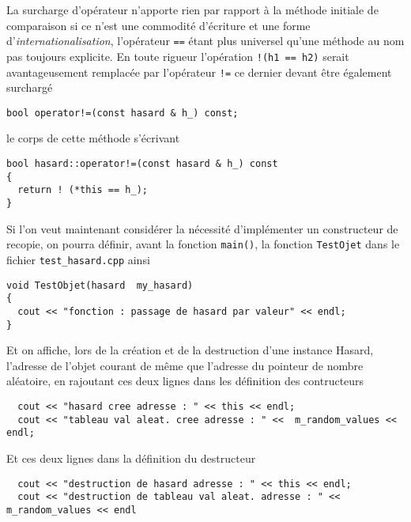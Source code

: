 \documentclass{book}
\begin{document}
\begin{correction}
La surcharge d'opérateur n'apporte rien par rapport à la méthode initiale de
comparaison si ce n'est une commodité d'écriture et une forme
d'\textit{internationalisation}, l'opérateur \texttt{==} étant plus universel qu'une méthode au
nom pas toujours explicite. En toute rigueur l'opération \texttt{!(h1 == h2)} serait
avantageusement remplacée par l'opérateur \texttt{!=} ce dernier devant être également
surchargé
\begin{verbatim}
bool operator!=(const hasard & h_) const;
\end{verbatim}
le corps de cette méthode s'écrivant
\begin{verbatim}
bool hasard::operator!=(const hasard & h_) const
{
  return ! (*this == h_);
}
\end{verbatim}




Si l'on veut maintenant considérer la nécessité d'implémenter un constructeur de recopie, on pourra définir,
avant la fonction \texttt{main()}, la fonction  \texttt{TestOjet} dans le fichier \texttt{test\_hasard.cpp} ainsi

\begin{verbatim}
void TestObjet(hasard  my_hasard)
{
  cout << "fonction : passage de hasard par valeur" << endl;
}
\end{verbatim}

Et on affiche, lors de la création et de la destruction d'une instance Hasard, l'adresse de l’objet
courant de même que l'adresse du pointeur de nombre aléatoire, en rajoutant ces deux lignes
dans les définition des contructeurs 

\begin{verbatim}
  cout << "hasard cree adresse : " << this << endl;
  cout << "tableau val aleat. cree adresse : " <<  m_random_values << endl;
\end{verbatim}

Et ces deux lignes dans la définition du destructeur
\begin{verbatim}
  cout << "destruction de hasard adresse : " << this << endl;
  cout << "destruction de tableau val aleat. adresse : " <<  m_random_values << endl
\end{verbatim}



\end{correction}
\end{document}
